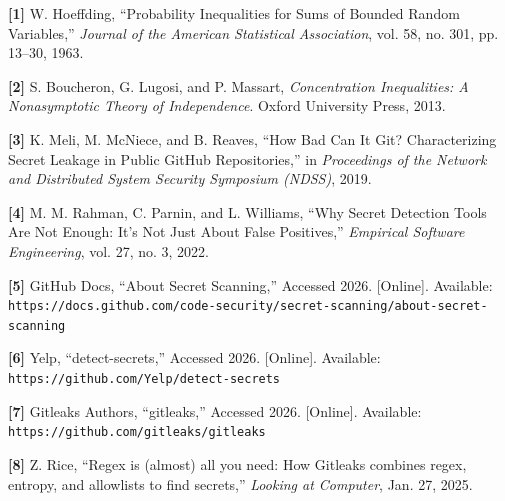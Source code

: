 \documentclass[10pt]{article}
\begin{document}
\textbf{[1]} W. Hoeffding, ``Probability Inequalities for Sums of Bounded Random Variables,'' \emph{Journal of the American Statistical Association}, vol. 58, no. 301, pp. 13--30, 1963.

\textbf{[2]} S. Boucheron, G. Lugosi, and P. Massart, \emph{Concentration Inequalities: A Nonasymptotic Theory of Independence}. Oxford University Press, 2013.

\textbf{[3]} K. Meli, M. McNiece, and B. Reaves, ``How Bad Can It Git? Characterizing Secret Leakage in Public GitHub Repositories,'' in \emph{Proceedings of the Network and Distributed System Security Symposium (NDSS)}, 2019.

\textbf{[4]} M. M. Rahman, C. Parnin, and L. Williams, ``Why Secret Detection Tools Are Not Enough: It's Not Just About False Positives,'' \emph{Empirical Software Engineering}, vol. 27, no. 3, 2022.

\textbf{[5]} GitHub Docs, ``About Secret Scanning,'' Accessed 2026. [Online]. Available: \texttt{https://docs.github.com/code-security/secret-scanning/about-secret-scanning}

\textbf{[6]} Yelp, ``detect-secrets,'' Accessed 2026. [Online]. Available: \texttt{https://github.com/Yelp/detect-secrets}

\textbf{[7]} Gitleaks Authors, ``gitleaks,'' Accessed 2026. [Online]. Available: \texttt{https://github.com/gitleaks/gitleaks}

\textbf{[8]} Z. Rice, ``Regex is (almost) all you need: How Gitleaks combines regex, entropy, and allowlists to find secrets,'' \emph{Looking at Computer}, Jan. 27, 2025.
\end{document}
